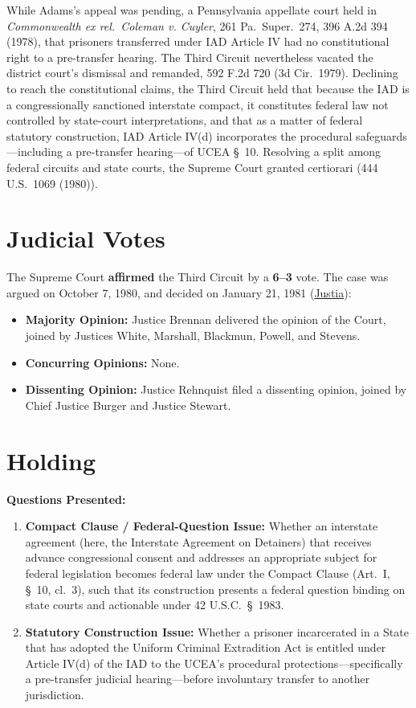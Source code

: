 \documentclass[12pt]{article}
\begin{document}
While Adams's appeal was pending, a Pennsylvania appellate court held in \textit{Commonwealth ex rel.\ Coleman v. Cuyler}, 261 Pa.\ Super.\ 274, 396 A.2d 394 (1978), that prisoners transferred under IAD Article IV had no constitutional right to a pre-transfer hearing. The Third Circuit nevertheless vacated the district court's dismissal and remanded, 592 F.2d 720 (3d Cir.\ 1979). Declining to reach the constitutional claims, the Third Circuit held that because the IAD is a congressionally sanctioned interstate compact, it constitutes federal law not controlled by state-court interpretations, and that as a matter of federal statutory construction, IAD Article IV(d) incorporates the procedural safeguards---including a pre-transfer hearing---of UCEA \S\ 10. Resolving a split among federal circuits and state courts, the Supreme Court granted certiorari (444 U.S.\ 1069 (1980)).

\section{Judicial Votes}
The Supreme Court \textbf{affirmed} the Third Circuit by a \textbf{6--3} vote. The case was argued on October 7, 1980, and decided on January 21, 1981 (\href{https://supreme.justia.com/cases/federal/us/449/433/}{Justia}):

\begin{itemize}
    \item \textbf{Majority Opinion:} Justice Brennan delivered the opinion of the Court, joined by Justices White, Marshall, Blackmun, Powell, and Stevens.
    \item \textbf{Concurring Opinions:} None.
    \item \textbf{Dissenting Opinion:} Justice Rehnquist filed a dissenting opinion, joined by Chief Justice Burger and Justice Stewart.
\end{itemize}

\section{Holding}
\textbf{Questions Presented:}

\begin{enumerate}
  \item \textbf{Compact Clause / Federal-Question Issue:} Whether an interstate agreement (here, the Interstate Agreement on Detainers) that receives advance congressional consent and addresses an appropriate subject for federal legislation becomes federal law under the Compact Clause (Art.\ I, \S\ 10, cl.\ 3), such that its construction presents a federal question binding on state courts and actionable under 42 U.S.C.\ \S\ 1983.
  \item \textbf{Statutory Construction Issue:} Whether a prisoner incarcerated in a State that has adopted the Uniform Criminal Extradition Act is entitled under Article IV(d) of the IAD to the UCEA's procedural protections---specifically a pre-transfer judicial hearing---before involuntary transfer to another jurisdiction.
\end{enumerate}
\end{document}
